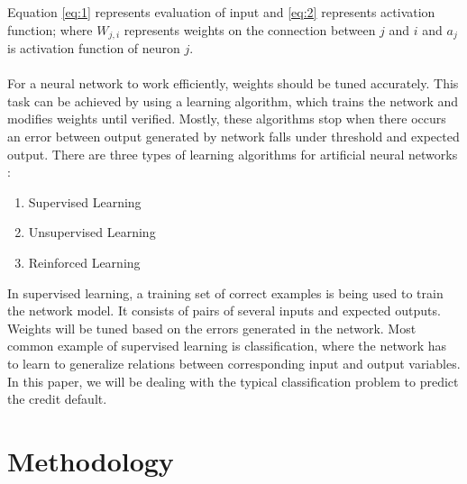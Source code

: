 \documentclass{article}[]
\begin{document}
Equation \ref{eq:1} represents evaluation of input and \ref{eq:2} represents activation function; where $W_{j,i}$ represents weights on the connection between $j$ and $i$ and $a_{j}$ is activation function of neuron $j$.\\\\
For a neural network to work efficiently, weights should be tuned accurately. This task can be achieved by using a learning algorithm, which trains the network and modifies weights until verified. Mostly, these algorithms stop when there occurs an error between output generated by network falls under threshold and expected output. There are three types of learning algorithms for artificial neural networks \cite{angelini2008neural}:
\begin{enumerate}
\item Supervised Learning
\item Unsupervised Learning
\item Reinforced Learning
\end{enumerate}

In supervised learning, a training set of correct examples is being used to train the network model. It consists of pairs of several inputs and expected outputs. Weights will be tuned based on the errors generated in the network. Most common example of supervised learning is classification, where the network has to learn to generalize relations between corresponding input and output variables. In this paper, we will be dealing with the typical classification problem to predict the credit default. 

\section{Methodology}
\end{document}
